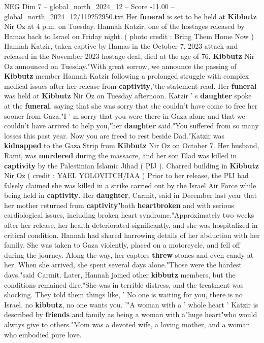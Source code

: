 \begin{textsample}{NEG Dim 7 – global\_north\_2024\_12 – Score -11.00 – global\_north\_2024\_12/119252950.txt}  \label{ex:f7_neg_153}
Her \textbf{funeral} is set to be held at \textbf{Kibbutz} Nir Oz at 4 p.m. on Tuesday.
Hannah Katzir, one of the hostages released by Hamas back to Israel on Friday night. ( photo credit : Bring Them Home Now ) Hannah Katzir, taken captive by Hamas in the October 7, 2023 attack and released in the November 2023 hostage deal, died at the age of 76, \textbf{Kibbutz} Nir Oz announced on Tuesday."With great sorrow, we announce the passing of \textbf{Kibbutz} member Hannah Katzir following a prolonged struggle with complex medical issues after her release from \textbf{captivity},"the statement read.
Her \textbf{funeral} was held at \textbf{Kibbutz} Nir Oz on Tuesday afternoon.
Katzir ' s \textbf{daughter} spoke at the \textbf{funeral}, saying that she was sorry that she couldn't have come to free her sooner from Gaza."I ' m sorry that you were there in Gaza alone and that we couldn't have arrived to help you,"her \textbf{daughter} said."You suffered from so many losses this past year.
Now you are freed to rest beside Dad."Katzir was \textbf{kidnapped} to the Gaza Strip from \textbf{Kibbutz} Nir Oz on October 7.
Her husband, Rami, was \textbf{murdered} during the massacre, and her son Elad was killed in \textbf{captivity} by the Palestinian Islamic Jihad ( PIJ ).
Charred building in \textbf{Kibbutz} Nir Oz ( credit : YAEL YOLOVITCH/IAA ) Prior to her release, the PIJ had falsely claimed she was killed in a strike carried out by the Israel Air Force while being held in \textbf{captivity}.
Her \textbf{daughter}, Carmit, said in December last year that her mother returned from \textbf{captivity}"both \textbf{heartbroken} and with serious cardiological issues, including broken heart syndrome."Approximately two weeks after her release, her health deteriorated significantly, and she was hospitalized in critical condition.
Hannah had shared harrowing details of her abduction with her family.
She was taken to Gaza violently, placed on a motorcycle, and fell off during the journey.
Along the way, her captors \textbf{threw} stones and even candy at her.
When she arrived, she spent several days alone."Those were the hardest days,"said Carmit.
Later, Hannah joined other \textbf{kibbutz} members, but the conditions remained dire."She was in terrible distress, and the treatment was shocking.
They told them things like, ' No one is waiting for you, there is no Israel, no \textbf{kibbutz}, no one wants you. '"A woman with a ' whole heart ' Katzir is described by \textbf{friends} and family as being a woman with a"huge heart"who would always give to others."Mom was a devoted wife, a loving mother, and a woman who embodied pure love.

\end{textsample}
